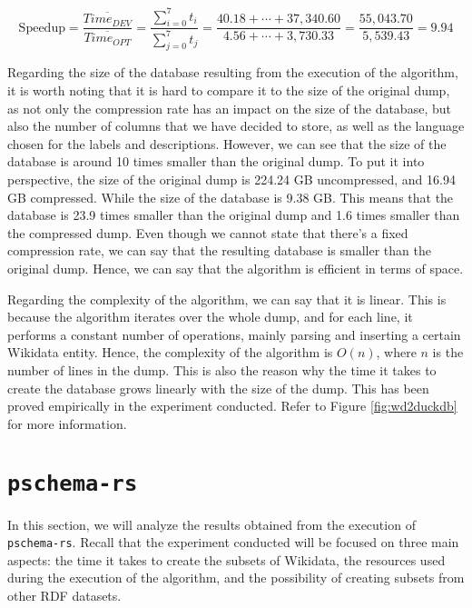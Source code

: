 \begin{equation}
    \text{Speedup} = \frac{\overline{Time_{DEV}}}{\overline{Time_{OPT}}} = \frac{\sum_{i=0}^{7}t_i}{\sum_{j=0}^{7}t_j} = \frac{40.18 + \cdots + 37,340.60}{4.56 + \cdots + 3,730.33} = \frac{55,043.70}{5,539.43} = 9.94
\end{equation}

Regarding the size of the database resulting from the execution of the algorithm, it is worth noting that it is hard to compare it to the size of the original dump, as not only the compression rate has an impact on the size of the database, but also the number of columns that we have decided to store, as well as the language chosen for the labels and descriptions. However, we can see that the size of the database is around 10 times smaller than the original dump. To put it into perspective, the size of the original dump is  224.24 GB uncompressed, and 16.94 GB compressed. While the size of the database is 9.38 GB. This means that the database is 23.9 times smaller than the original dump and 1.6 times smaller than the compressed dump. Even though we cannot state that there's a fixed compression rate, we can say that the resulting database is smaller than the original dump. Hence, we can say that the algorithm is efficient in terms of space.

Regarding the complexity of the algorithm, we can say that it is linear. This is because the algorithm iterates over the whole dump, and for each line, it performs a constant number of operations, mainly parsing and inserting a certain Wikidata entity. Hence, the complexity of the algorithm is $O(n)$, where $n$ is the number of lines in the dump. This is also the reason why the time it takes to create the database grows linearly with the size of the dump. This has been proved empirically in the experiment conducted. Refer to Figure \ref{fig:wd2duckdb} for more information.

\section{\texttt{pschema-rs}}

In this section, we will analyze the results obtained from the execution of \texttt{pschema-rs}. Recall that the experiment conducted will be focused on three main aspects: the time it takes to create the subsets of Wikidata, the resources used during the execution of the algorithm, and the possibility of creating subsets from other RDF datasets.

